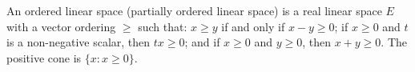 An ordered linear space (partially ordered linear space) is a real linear space $E$ with a vector ordering $\geq$ such that: $x \geq y$ if and only if $x - y \geq 0$; if $x \geq 0$ and $t$ is a non-negative scalar, then $tx \geq 0$; and if $x \geq 0$ and $y \geq 0$, then $x + y \geq 0$. The positive cone is $\{x : x \geq 0\}$.
